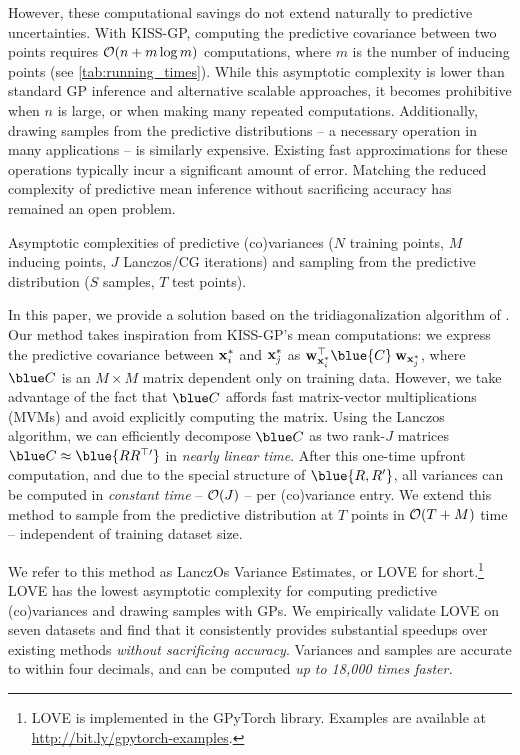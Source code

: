 However, these computational savings do not extend naturally to predictive uncertainties.
With KISS-GP, computing the predictive covariance between two points requires $\bigo{n + m \log m}$ computations, where $m$ is the number of inducing points (see \autoref{tab:running_times}).
While this asymptotic complexity is lower than standard GP inference and alternative scalable approaches, it becomes prohibitive when $n$ is large, or when making many repeated computations.
Additionally, drawing samples from the predictive distributions -- a necessary operation in many applications -- is similarly expensive.
Existing fast approximations for these operations \cite{papandreou2011efficient,wilson2015thoughts,wang2017max} typically incur a significant amount of error.
Matching the reduced complexity of predictive mean inference without sacrificing accuracy has remained an open problem.

\begin{table}[t!]
  \caption{
    Asymptotic complexities of predictive (co)variances ($N$ training points, $M$ inducing points, $J$ Lanczos/CG iterations)
    and sampling from the predictive distribution ($S$ samples, $T$ test points).
    \label{tab:running_times}
  }
  \vspace{0.5ex}
  \centering
  \resizebox{\textwidth}{!}{%
    
  }
  \vspace{-2ex}
\end{table}


In this paper, we provide a solution based on the tridiagonalization algorithm of \citet{lanczos1950iteration}.
Our method takes inspiration from KISS-GP's mean computations: we express the predictive covariance between $\mathbf{x}^*_i$ and $\mathbf{x}^{*}_j$ as
$\bw_{\bxtest_i}^\top \blue{\bC} \: \bw_{\bxtest_j}$,
where $\blue C$ is an $M \times M$ matrix dependent only on training data.
However, we take advantage of the fact that $\blue \bC$ affords fast matrix-vector multiplications (MVMs) and avoid explicitly computing the matrix.
Using the Lanczos algorithm, we can efficiently decompose $\blue \bC$ as two rank-$J$ matrices $\blue \bC \approx \blue{\bR \bR^{\top \prime}}$ in \emph{nearly linear time}.
After this one-time upfront computation, and due to the special structure of $\blue {\bR,\bR^\prime}$, all variances can be computed in \emph{constant time} -- $\bigo{J}$ -- per (co)variance entry.
We extend this method to sample from the predictive distribution at $T$ points in $\bigo{T + M}$ time -- independent of training dataset size.

We refer to this method as LanczOs Variance Estimates, or LOVE{} for short.\footnote{
  LOVE{} is implemented in the GPyTorch library.
  Examples are available at \url{http://bit.ly/gpytorch-examples}.
}
LOVE{} has the lowest asymptotic complexity for computing predictive (co)variances and drawing samples with GPs.
We empirically validate LOVE{} on seven datasets and find that it consistently provides substantial speedups over existing methods \emph{without sacrificing accuracy}.
Variances and samples are accurate to within four decimals, and can be computed \emph{up to 18,000 times faster.}
